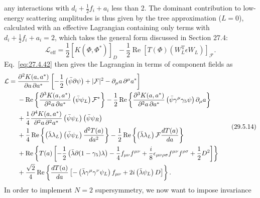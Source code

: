 any interactions with \(d_i+\tfrac12f_i+a_i\) less than 2. The dominant
contribution to low-energy scattering amplitudes is thus given by the tree
approximation (\(L=0\)), calculated with an effective Lagrangian containing
only terms with \(d_i+\tfrac12f_i+a_i=2\), which takes the general form
discussed in Section 27.4:
\begin{equation}
  \mathcal{L}_{\mathrm{eff}}
  =\frac12\left[K(\Phi,\Phi^*)\right]_D
  -\frac12\operatorname{Re}
    \left[T(\Phi)\left(W_L^{\mathrm T}\epsilon W_L\right)\right]_{\mathcal F}.
  \tag{29.5.13}\label{eq:29.5.13}
\end{equation}
Eq.~\eqref{eq:27.4.42} then gives the Lagrangian in terms of component
fields as
\begin{equation}
  \begin{aligned}
  \mathcal{L}
  ={}&
  \frac{\partial^2K(a,a^*)}{\partial a\,\partial a^*}
  \left[
    -\frac12\left(\bar\psi\sl{\partial}\psi\right)
    +\lvert\mathcal{F}\rvert^2
    -\partial_\mu a\,\partial^\mu a^*
  \right]
  \\
  &-\operatorname{Re}\left\{
    \frac{\partial^3K(a,a^*)}{\partial^2a\,\partial a^*}
    \left(\bar\psi\psi_L\right)\mathcal{F}^*
  \right\}
  -\frac12\operatorname{Re}\left\{
    \frac{\partial^3K(a,a^*)}{\partial^2a\,\partial a^*}
    \left(\bar\psi\gamma^\mu\gamma_5\psi\right)\partial_\mu a
  \right\}
  \\
  &+\frac14
    \frac{\partial^4K(a,a^*)}{\partial^2a\,\partial^2a^*}
    \left(\bar\psi\psi_L\right)\left(\bar\psi\psi_R\right)
  \\
  &+\frac14\operatorname{Re}\left\{
    \left(\bar\lambda\lambda_L\right)
    \left(\bar\psi\psi_L\right)\frac{d^2T(a)}{da^2}
  \right\}
  -\frac12\operatorname{Re}\left\{
    \left(\bar\lambda\lambda_L\right)\mathcal{F}\frac{dT(a)}{da}
  \right\}
  \\
  &+\operatorname{Re}\left\{
    T(a)\left[
      -\frac12\left(\bar\lambda\sl{\partial}(1-\gamma_5)\lambda\right)
      -\frac14f_{\mu\nu}f^{\mu\nu}
      +\frac{i}{8}\epsilon_{\mu\nu\rho\sigma}
        f^{\mu\nu}f^{\rho\sigma}
      +\frac12D^2
    \right]
  \right\}
  \\
  &+\frac{\sqrt{2}}{4}\operatorname{Re}\left\{
    \frac{dT(a)}{da}\left[
      -\left(\bar\lambda\gamma^\mu\gamma^\nu\psi_L\right)f_{\mu\nu}
      +2i\left(\bar\lambda\psi_L\right)D
    \right]
  \right\}.
  \end{aligned}
  \tag{29.5.14}\label{eq:29.5.14}
\end{equation}
In order to implement \(N=2\) supersymmetry, we now want to impose invariance
